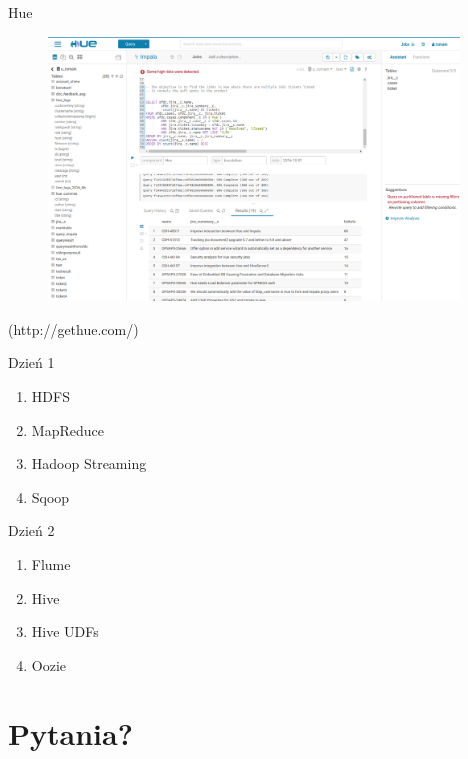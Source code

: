 \documentclass{beamer}
\begin{document}
\begin{frame}{Hue}
	\begin{figure}
		\includegraphics[width=\textwidth,height=7cm,keepaspectratio=true]{hue}
	\end{figure}
	\begin{center}
		{\tiny (http://gethue.com/)}
	\end{center}
\end{frame}


\begin{frame}{Dzień 1}
	\begin{enumerate}
		\item HDFS
		\item MapReduce
		\item Hadoop Streaming
		\item Sqoop
	\end{enumerate}
\end{frame}
\begin{frame}{Dzień 2}
	\begin{enumerate}
		\item Flume
		\item Hive
		\item Hive UDFs
		\item Oozie
	\end{enumerate}
\end{frame}

\section{Pytania?}
\end{document}
